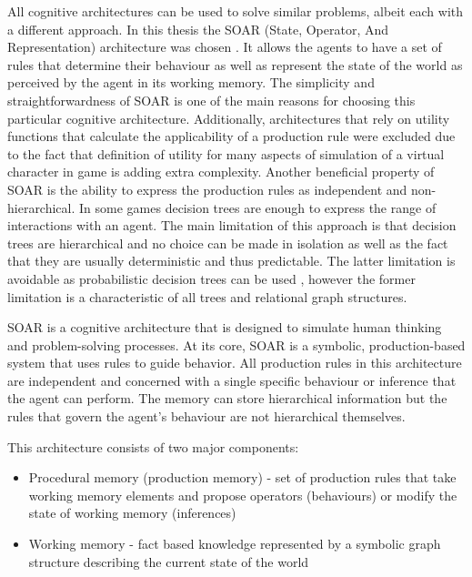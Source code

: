 All cognitive architectures can be used to solve similar problems, albeit each with a different approach.
In this thesis the SOAR (State, Operator, And Representation) architecture was chosen \cite{laird2019soar}.
It allows the agents to have a set of rules that determine their behaviour as well as represent the state of the world as perceived by the agent in its working memory.
The simplicity and straightforwardness of SOAR is one of the main reasons for choosing this particular cognitive architecture.
Additionally, architectures that rely on utility functions that calculate the applicability of a production rule were excluded due to the fact that definition of utility for many aspects of simulation of a virtual character in game is adding extra complexity.
Another beneficial property of SOAR is the ability to express the production rules as independent and non-hierarchical.
In some games decision trees are enough to express the range of interactions with an agent\cite{sweetser2002current}.
The main limitation of this approach is that decision trees are hierarchical and no choice can be made in isolation as well as the fact that they are usually deterministic and thus predictable.
The latter limitation is avoidable as probabilistic decision trees can be used \cite{saks1986probabilistic}, however the former limitation is a characteristic of all trees and relational graph structures.

SOAR is a cognitive architecture that is designed to simulate human thinking and problem-solving processes.
At its core, SOAR is a symbolic, production-based system that uses rules to guide behavior.
All production rules in this architecture are independent and concerned with a single specific behaviour or inference that the agent can perform.
The memory can store hierarchical information but the rules that govern the agent's behaviour are not hierarchical themselves.

This architecture consists of two major components:

\begin{itemize}
    \item Procedural memory (production memory) - set of production rules that take working memory elements and propose operators (behaviours) or modify the state of working memory (inferences)
    \item Working memory - fact based knowledge represented by a symbolic graph structure describing the current state of the world
\end{itemize}

